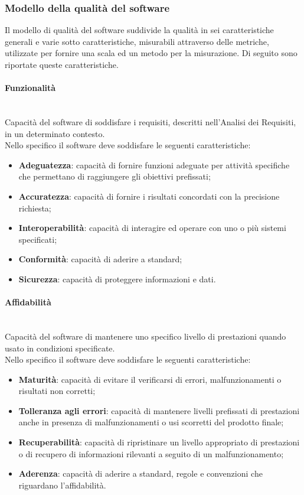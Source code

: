 		\subsubsection{Modello della qualità del software}
		Il modello di qualità del software suddivide la qualità in sei caratteristiche generali e varie sotto caratteristiche, misurabili attraverso delle metriche, utilizzate per fornire una scala ed un metodo per la misurazione. Di seguito sono riportate queste caratteristiche.

		\paragraph{Funzionalità}\leavevmode \\
		Capacità del software di soddisfare i requisiti, descritti nell'Analisi dei Requisiti, in un determinato contesto.\\
		Nello specifico il software deve soddisfare le seguenti caratteristiche:
		\begin{itemize}
			\item \textbf{Adeguatezza}: capacità di fornire funzioni adeguate per attività specifiche che permettano di raggiungere gli obiettivi prefissati;
			\item \textbf{Accuratezza}: capacità di fornire i risultati concordati con la precisione richiesta;
			\item \textbf{Interoperabilità}: capacità di interagire ed operare con uno o più sistemi specificati;
			\item \textbf{Conformità}: capacità di aderire a standard;
			\item \textbf{Sicurezza}: capacità di proteggere informazioni e dati.
		\end{itemize}
		\paragraph{Affidabilità}\leavevmode \\
		Capacità del software di mantenere uno specifico livello di prestazioni quando usato in condizioni specificate.\\
		Nello specifico il software deve soddisfare le seguenti caratteristiche:
		\begin{itemize}
			\item \textbf{Maturità}: capacità di evitare il verificarsi di errori, malfunzionamenti o risultati non corretti;
			\item \textbf{Tolleranza agli errori}: capacità di mantenere livelli prefissati di prestazioni anche in presenza di malfunzionamenti o usi scorretti del prodotto finale;
			\item \textbf{Recuperabilità}: capacità di ripristinare un livello appropriato di prestazioni o di recupero di informazioni rilevanti a seguito di un malfunzionamento;
			\item \textbf{Aderenza}:  capacità di aderire a standard, regole e convenzioni che riguardano l'affidabilità.
		\end{itemize}
